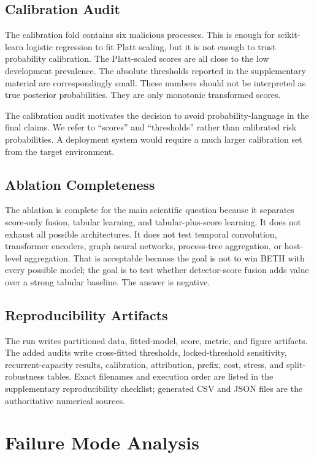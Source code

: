 \documentclass[10pt,journal,compsoc]{IEEEtran}
\begin{document}
\subsection{Calibration Audit}

The calibration fold contains six malicious processes. This is enough for scikit-learn logistic regression to fit Platt scaling, but it is not enough to trust probability calibration. The Platt-scaled scores are all close to the low development prevalence. The absolute thresholds reported in the supplementary material are correspondingly small. These numbers should not be interpreted as true posterior probabilities. They are only monotonic transformed scores.

The calibration audit motivates the decision to avoid probability-language in the final claims. We refer to ``scores'' and ``thresholds'' rather than calibrated risk probabilities. A deployment system would require a much larger calibration set from the target environment.

\subsection{Ablation Completeness}

The ablation is complete for the main scientific question because it separates score-only fusion, tabular learning, and tabular-plus-score learning. It does not exhaust all possible architectures. It does not test temporal convolution, transformer encoders, graph neural networks, process-tree aggregation, or host-level aggregation. That is acceptable because the goal is not to win BETH with every possible model; the goal is to test whether detector-score fusion adds value over a strong tabular baseline. The answer is negative.

\subsection{Reproducibility Artifacts}

The run writes partitioned data, fitted-model, score, metric, and figure artifacts. The added audits write cross-fitted thresholds, locked-threshold sensitivity, recurrent-capacity results, calibration, attribution, prefix, cost, stress, and split-robustness tables. Exact filenames and execution order are listed in the supplementary reproducibility checklist; generated CSV and JSON files are the authoritative numerical sources.

\section{Failure Mode Analysis}
\label{sec:failure}
\end{document}
